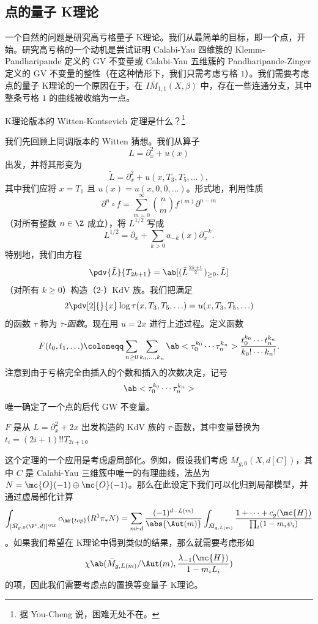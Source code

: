 \subsection{点的量子 K理论}%
\label{sub:Quantum K-theory of a point}

一个自然的问题是研究高亏格量子 K理论。我们从最简单的目标，即一个点，开始。研究高亏格的一个动机是尝试证明 Calabi-Yau 四维簇的 Klemm-Pandharipande 定义的 GV 不变量或 Calabi-Yau 五维簇的 Pandharipande-Zinger 定义的 GV 不变量的整性（在这种情形下，我们只需考虑亏格 \(1\)）。我们需要考虑点的量子 K理论的一个原因在于，在 \(I\bar{M}_{1,1}(X, \beta)\) 中，存在一些连通分支，其中整条亏格 \(1\) 的曲线被收缩为一点。

\begin{quest}
    K理论版本的 Witten-Kontsevich 定理是什么？\footnote{据 You-Cheng 说，困难无处不在。}
\end{quest}

我们先回顾上同调版本的 Witten 猜想。我们从算子
\[ L = \partial_x^2 + u(x) \]
出发，并将其形变为
\[ \tilde{L} = \partial_x^2 + u(x, T_3, T_5, \ldots), \]
其中我们应将 \(x = T_1\) 且 \(u(x) = u(x, 0, 0,\ldots)\)。形式地，利用性质
\[ \partial^n \circ f = \sum_{m = 0}^{\infty} \binom{n}{m} f^{(m)} \partial^{n-m} \]
（对所有整数 \(n \in \Z\) 成立），将 \(L^{1/2}\) 写成
\[ L^{1/2} = \partial_x + \sum_{k > 0} a_{-k}(x) \partial_x^{-k}. \]
特别地，我们由方程
\[ \pdv{\tilde{L}}{T_{2k+1}} = \ab[(\tilde{L}^{\frac{2k+1}{2}})_{\geq 0}, \tilde{L}] \]
（对所有 \(k \geq 0\)）构造（2-）KdV 族。我们把满足
\[ 2 \pdv[2]{}{x}\log \tau(x, T_3, T_5, \ldots) = u(x, T_3, T_5, \ldots) \]
的函数 \(\tau\) 称为 \textit{\(\tau\)-函数}。现在用 \(u = 2x\) 进行上述过程。定义函数
\[ F(t_0, t_1, \ldots) \coloneqq \sum_{n \geq 0} \sum_{k_0, \ldots, k_n} \ab<\tau_0^{k_0} \cdots \tau_n^{k_n}> \frac{t_0^{k_0} \cdots t_n^{k_n}}{k_0! \cdots k_n!}. \]
注意到由于亏格完全由插入的个数和插入的次数决定，记号
\[ \ab<\tau_0^{k_0} \cdots \tau_n^{k_n}> \]
唯一确定了一个点的后代 GW 不变量。

\begin{thm}
    \(F\) 是从 \(L = \partial_x^2 + 2x\) 出发构造的 KdV 族的 \(\tau\)-函数，其中变量替换为 \(t_i = (2i+1)!! T_{2i+1}\)。
\end{thm}

这个定理的一个应用是考虑虚局部化。例如，假设我们考虑 \(\bar{M}_{g,0}(X, d[C])\)，其中 \(C\) 是 Calabi-Yau 三维簇中唯一的有理曲线，法丛为 \(N = \mc{O}(-1)\oplus \mc{O}(-1)\)。那么在此设定下我们可以化归到局部模型，并通过虚局部化计算
\begin{align*}
    \int_{[\bar{M}_{g,0}(\P^1, d)]^{\vir}} c_{\mr{top}}(R^1 \pi_* N) = \sum_{m \vdash d} \frac{(-1)^{d-L(m)}}{\abs{\Aut(m)}} \int_{\bar{M}_{g, L(m)}} \frac{1 + \cdots + c_g(\mc{H})}{\prod_i (1-m_i \psi_i)}
\end{align*}
。如果我们希望在 K理论中得到类似的结果，那么就需要考虑形如
\[ \chi\ab(\bar{M}_{g, L(m)}/\Aut(m), \frac{\lambda_{-1}(\mc{H})}{1-m_i L_i}) \]
的项，因此我们需要考虑点的置换等变量子 K理论。

